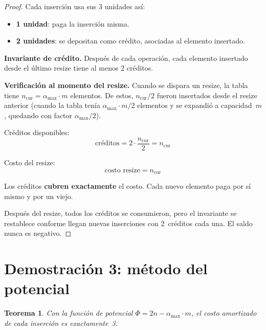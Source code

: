 \documentclass[11pt, letterpaper]{article}
\theoremstyle{definition}
\theoremstyle{plain}
\newtheorem{theorem}{Teorema}[section]
\theoremstyle{remark}
\begin{document}
\begin{proof}
Cada inserción usa sus 3 unidades así:
\begin{itemize}
  \item \textbf{1 unidad}: paga la inserción misma.
  \item \textbf{2 unidades}: se depositan como crédito, asociadas al
    elemento insertado.
\end{itemize}

\textbf{Invariante de crédito.} Después de cada operación, cada
elemento insertado desde el último resize tiene al menos 2 créditos.

\textbf{Verificación al momento del resize.} Cuando se dispara un
resize, la tabla tiene $n_{\text{cur}} = \alpha_{\max} \cdot m$
elementos. De estos, $n_{\text{cur}}/2$ fueron insertados desde el
resize anterior (cuando la tabla tenía $\alpha_{\max} \cdot m/2$
elementos y se expandió a capacidad~$m$, quedando con factor
$\alpha_{\max}/2$).

Créditos disponibles:
\[
  \text{créditos} = 2 \cdot \frac{n_{\text{cur}}}{2} = n_{\text{cur}}
\]

Costo del resize:
\[
  \text{costo resize} = n_{\text{cur}}
\]

Los créditos \textbf{cubren exactamente} el costo. Cada nuevo
elemento paga por sí mismo y por un viejo.

Después del resize, todos los créditos se consumieron, pero el
invariante se restablece conforme llegan nuevas inserciones con
2~créditos cada una. El saldo nunca es negativo. \checkmark
\end{proof}

\section{Demostración 3: método del potencial}

\begin{theorem}\label{thm:potential}
Con la función de potencial $\Phi = 2n - \alpha_{\max} \cdot m$, el
costo amortizado de cada inserción es exactamente~3.
\end{theorem}
\end{document}
